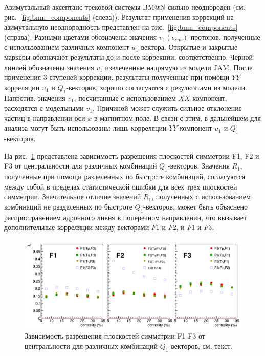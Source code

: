 Азимутальный аксептанс трековой системы BM@N сильно неоднороден (см. рис.~\ref{fig:bmn_components} (слева)).
Результат  применения коррекций на азимутальную неоднородность представлен на рис.~\ref{fig:bmn_components} (справа).
Разными цветами обозначены значения $v_1(e_{cm})$ протонов, полученные с использованием различных компонент $u_1$-вектора. 
Открытые и закрытые маркеры обозначают результаты до и после коррекции, соответственно.
Черной линией обозначены значения $v_1$  извлеченные напрямую из модели JAM.
После применения 3 ступеней коррекции, результаты полученные при помощи $YY$ корреляции $u_1$ и $Q_1$-векторов, хорошо согласуются с результатами из модели.
Напротив, значения $v_1$, посчитанные с использованием $XX$-компонент, расходятся с модельными  $v_1$. 
Причиной может служить сильное отклонение частиц в направлении оси $x$ в магнитном поле. 
В связи с этим, в дальнейшем для анализа могут быть использованы лишь корреляции $YY$-компонент $u_1$ и $Q_1$-векторов.

На рис.~\ref{fig:bmn_combinations} представлена зависимость разрешения плоскостей симметрии F1, F2 и F3 от
центральности для различных комбинаций $Q_1$-векторов.
Значения $R_1$, полученные при помощи разделенных по быстроте комбинаций, согласуются между собой в пределах статистической ошибки для всех трех плоскостей симметрии. 
Значительное отличие значений $R_1$, полученных с использованием комбинаций не разделенных по быстроте $Q_1$-векторов, может быть объяснено распространением адронного ливня в поперечном направлении, что вызывает дополнительные корреляции между векторами $F1$ и $F2$, и $F1$ и $F3$.
%
\begin{figure}[h]
\begin{center}
\includegraphics[width=0.95\linewidth]{images/R1_F123_combinations_centrality.png}
\caption{Зависимость разрешения плоскостей симметрии F1-F3 от центральности для различных комбинаций $Q_1$-векторов, см. текст.}
\label{fig:bmn_combinations}
\end{center}
\end{figure}

